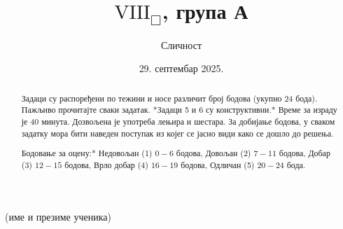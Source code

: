 \documentclass[11pt,a5paper,addpoints]{exam}
\title{$\mathrm{VIII}_\Box$, група А}
\author{Сличност}
\date{29. септембар 2025.}
\begin{document}
\maketitle
\thispagestyle{headandfoot}

\begin{center} \small
 \hrulefill \par (име и презиме ученика)
\end{center}

\begin{abstract}
Задаци су распоређени по тежини и носе различит број бодова (укупно 24 бода). Пажљиво прочитајте сваки задатак. *Задаци 5 и 6 су конструктивни.* Време за израду је 40 минута. Дозвољена је употреба лењира и шестара.
За добијање бодова, у сваком задатку мора бити наведен поступак из којег се јасно види како се дошло до решења.

\medskip
\noindent *Бодовање за оцену:* Недовољан (1) $0 - 6$ бодова, Довољан (2) $7 - 11$ бодова, Добар (3) $12 - 15$ бодова, Врло добар (4) $16 - 19$ бодова, Одличан (5) $20 - 24$ бода.
\end{abstract}

\noindent \gradetable[h]
\end{document}
